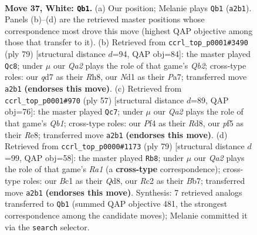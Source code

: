 \documentclass[11pt]{article}
\begin{document}
\begin{figure}[p]
\label{fig:thought-m70}
\end{figure}

\clearpage

\begin{figure}[p]\centering
\begin{subfigure}{0.46\textwidth}\centering
\resizebox{\linewidth}{!}{%
\newchessgame
\chessboard[
  setfen={n1r3k1/p2qbrn1/b7/P1p2p1p/3p1Pp1/1P4P1/Q1R1P1BP/R1BNN1K1 w - - 6 37},
  showmover=false,
  pgfstyle=straightmove, color=movearrow, markmove={a2-b1}
]}
\caption{}
\end{subfigure}\hfill
\begin{subfigure}{0.46\textwidth}\centering
\resizebox{\linewidth}{!}{%
\newchessgame
\chessboard[
  setfen={7r/pqr1bpk1/1pbp2p1/4p2p/P1P1P3/1PNR1B1P/3Q1PP1/R5K1 b - - 22 40},
  showmover=false,
  pgfstyle=straightmove, color=movearrow, markmove={b7-c8}
]}
\caption{}
\end{subfigure}
\\[4pt]
\begin{subfigure}{0.46\textwidth}\centering
\resizebox{\linewidth}{!}{%
\newchessgame
\chessboard[
  setfen={1q1rr1k1/1b1nbpp1/pp1pp2p/8/P1PBPP2/1PN3PP/3R2BK/1Q1R4 b - - 16 29},
  showmover=false,
  pgfstyle=straightmove, color=movearrow, markmove={b8-c7}
]}
\caption{}
\end{subfigure}\hfill
\begin{subfigure}{0.46\textwidth}\centering
\resizebox{\linewidth}{!}{%
\newchessgame
\chessboard[
  setfen={r2qr1k1/1b1n1pb1/pp1p2pp/2pP4/P3PPP1/2NB1RBP/1P1Q2K1/4R3 b - - 13 40},
  showmover=false,
  pgfstyle=straightmove, color=movearrow, markmove={a8-b8}
]}
\caption{}
\end{subfigure}
\caption{\textbf{Move 37, White: \texttt{Qb1}.} (a) Our position; Melanie plays \texttt{Qb1} (\texttt{a2b1}). Panels (b)--(d) are the retrieved master positions whose correspondence most drove this move (highest QAP objective among those that transfer to it). (b) Retrieved from \texttt{ccrl\_top\_p0001\#3490} (ply 79) [structural distance $d$=94, QAP obj=84]: the master played \texttt{Qc8}; under $\mu$ our \emph{Qa2} plays the role of that game's \emph{Qb2}; cross-type roles: our \emph{q}d7 as their \emph{R}h8, our \emph{N}d1 as their \emph{P}a7; transferred move \texttt{a2b1} \textbf{(endorses this move)}. (c) Retrieved from \texttt{ccrl\_top\_p0001\#970} (ply 57) [structural distance $d$=89, QAP obj=76]: the master played \texttt{Qc7}; under $\mu$ our \emph{Qa2} plays the role of that game's \emph{Qb1}; cross-type roles: our \emph{P}f4 as their \emph{R}d8, our \emph{p}f5 as their \emph{R}e8; transferred move \texttt{a2b1} \textbf{(endorses this move)}. (d) Retrieved from \texttt{ccrl\_top\_p0000\#1173} (ply 79) [structural distance $d$=99, QAP obj=58]: the master played \texttt{Rb8}; under $\mu$ our \emph{Qa2} plays the role of that game's \emph{Ra1} (a \textbf{cross-type} correspondence); cross-type roles: our \emph{B}c1 as their \emph{Q}d8, our \emph{R}c2 as their \emph{B}b7; transferred move \texttt{a2b1} \textbf{(endorses this move)}. Synthesis: 7 retrieved analogs transferred to \texttt{Qb1} (summed QAP objective 481, the strongest correspondence among the candidate moves); Melanie committed it via the \texttt{search} selector.}

\end{figure}
\end{document}
